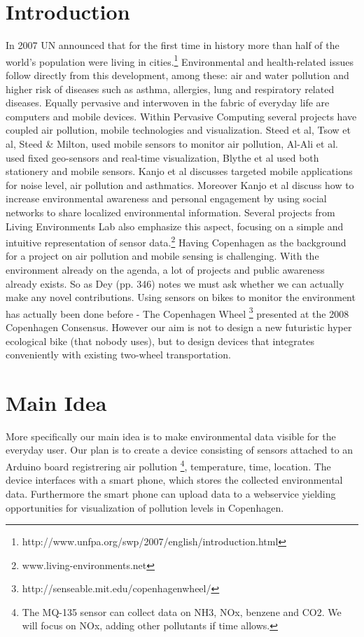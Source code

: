 \documentclass{ubicomp2011}
\begin{document}
\section{Introduction}
In 2007 UN announced that for the first time in history more than half of the world’s population were living in cities.\footnote{http://www.unfpa.org/swp/2007/english/introduction.html} Environmental and health-related issues follow directly from this development, among these: air and water pollution and higher risk of diseases such as asthma, allergies, lung and respiratory related diseases. 
Equally pervasive and interwoven in the fabric of everyday life are computers and mobile devices. Within Pervasive Computing several projects have coupled air pollution, mobile technologies and visualization. Steed et al\cite{steed2003}, Tsow et al\cite{tsow2009}, Steed \& Milton\cite{steed2008}, used mobile sensors to monitor air pollution, Al-Ali et al. \cite{al-ali2010} used fixed geo-sensors and real-time visualization, Blythe et al \cite{blythe2008} used both stationery and mobile sensors. Kanjo et al \cite{kanjo_mobsens_2009} discusses targeted mobile applications for noise level, air pollution and asthmatics. Moreover Kanjo et al\cite{kanjo_mobsens_2009} discuss how to increase environmental awareness and personal engagement by using social networks to share localized environmental information. Several projects from Living Environments Lab also emphasize this aspect, focusing on a simple and intuitive representation of sensor data.\footnote{www.living-environments.net}
Having Copenhagen as the background for a project on air pollution and mobile sensing is challenging. With the environment already on the agenda, a lot of projects and public awareness  already exists. So as Dey \cite{krumm_ubiquitous_2010} (pp. 346) notes we must ask whether we can actually make any novel contributions. Using sensors on bikes to monitor the environment has actually been done before - The Copenhagen Wheel \footnote{http://senseable.mit.edu/copenhagenwheel/} presented at the 2008 Copenhagen Consensus. However our aim is not to design a new futuristic hyper ecological bike (that nobody uses), but to design devices that integrates conveniently with existing two-wheel transportation.
\pagebreak
\section{Main Idea}
More specifically our main idea is to make environmental data visible for the everyday user. Our  plan is to create a device consisting of sensors attached to an Arduino board registrering air pollution \footnote{The MQ-135 sensor can collect data on NH3, NOx, benzene and CO2. We will focus on NOx, adding other pollutants if time allows.}, temperature, time, location. The device interfaces with a smart phone, which stores the collected environmental data. Furthermore the smart phone can upload data to a webservice yielding opportunities for visualization of pollution levels in Copenhagen.
\end{document}

